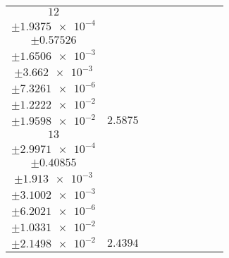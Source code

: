 \documentclass[8pt]{article}
\begin{document}
\begin{longtable}[l]{c c c c c c c c c}
$\num{12}$ & \begin{tabular}[c]{@{}c@{}}$\num{2.9887e-2}$ \\ $\pm\num{1.9375e-4}$\end{tabular} & \begin{tabular}[c]{@{}c@{}}$\num{0.32652}$ \\ $\pm\num{0.57526}$\end{tabular} & \begin{tabular}[c]{@{}c@{}}$\num{6.8088}$ \\ $\pm\num{1.6506e-3}$\end{tabular} & \begin{tabular}[c]{@{}c@{}}$\num{1.4453e+3}$ \\ $\pm\num{3.662e-3}$\end{tabular} & \begin{tabular}[c]{@{}c@{}}$\num{2.8913}$ \\ $\pm\num{7.3261e-6}$\end{tabular} & \begin{tabular}[c]{@{}c@{}}$\num{1.1855}$ \\ $\pm\num{1.2222e-2}$\end{tabular} & \begin{tabular}[c]{@{}c@{}}$\num{4.0406}$ \\ $\pm\num{1.9598e-2}$\end{tabular} & $\num{2.5875}$\\
$\num{13}$ & \begin{tabular}[c]{@{}c@{}}$\num{2.8841e-2}$ \\ $\pm\num{2.9971e-4}$\end{tabular} & \begin{tabular}[c]{@{}c@{}}$\num{0.31821}$ \\ $\pm\num{0.40855}$\end{tabular} & \begin{tabular}[c]{@{}c@{}}$\num{7.0894}$ \\ $\pm\num{1.913e-3}$\end{tabular} & \begin{tabular}[c]{@{}c@{}}$\num{1.4455e+3}$ \\ $\pm\num{3.1002e-3}$\end{tabular} & \begin{tabular}[c]{@{}c@{}}$\num{2.8917}$ \\ $\pm\num{6.2021e-6}$\end{tabular} & \begin{tabular}[c]{@{}c@{}}$\num{1.1519}$ \\ $\pm\num{1.0331e-2}$\end{tabular} & \begin{tabular}[c]{@{}c@{}}$\num{4.0264}$ \\ $\pm\num{2.1498e-2}$\end{tabular} & $\num{2.4394}$\\

\end{longtable}
\end{document}

